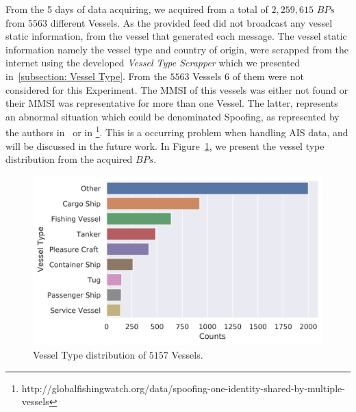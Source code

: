 From the 5 days of data acquiring, we acquired from a total of $2,259,615$ $BPs$ from $5563$ different Vessels.
As the provided feed did not broadcast any vessel static information, from the vessel that generated each message. The vessel static information namely the vessel type and country of origin, were scrapped from the internet using the developed \emph{Vessel Type Scrapper} which we presented in~\ref{subsection: Vessel Type}. 
From the $5563$ Vessels $6$ of them were not considered for this Experiment. The MMSI of this vessels was either not found or their MMSI was representative for more than one Vessel. The latter, represents an abnormal situation which could be denominated Spoofing, as represented by the authors in~\cite{Ray2015DeAISRisks} or in \footnote{http://globalfishingwatch.org/data/spoofing-one-identity-shared-by-multiple-vessels}. This is a occurring problem when handling AIS data, and will be discussed in the future work.
In Figure~\ref{fig: 5 Vessel Type Distribution}, we present the vessel type distribution from the acquired $BPs$.
\begin{figure}[H]
	\centering
	\includegraphics[scale = .7]{figures/Ch5/DataValidationVesselType.png}
    \caption{Vessel Type distribution of $5157$ Vessels.}
    \label{fig: 5 Vessel Type Distribution}
\end{figure}

